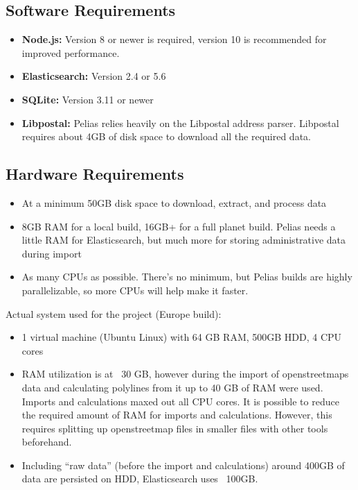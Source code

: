 \subsection{Software Requirements}
\begin{itemize}
\item \textbf{Node.js:} Version 8 or newer is required, version 10 is recommended for improved performance.
\item \textbf{Elasticsearch:} Version 2.4 or 5.6
\item \textbf{SQLite:} Version 3.11 or newer
\item \textbf{Libpostal:} Pelias relies heavily on the Libpostal address parser. Libpostal requires about 4GB of disk space to download all the required data.
\end{itemize}

\subsection{Hardware Requirements}
\begin{itemize}
\item At a minimum 50GB disk space to download, extract, and process data
\item 8GB RAM for a local build, 16GB+ for a full planet build. Pelias needs a little RAM for Elasticsearch, but much more for storing administrative data during import
\item As many CPUs as possible. There's no minimum, but Pelias builds are highly parallelizable, so more CPUs will help make it faster.
\end{itemize}

Actual system used for the project (Europe build):
\begin{itemize}
\item 1 virtual machine (Ubuntu Linux) with 64 GB RAM, 500GB HDD, 4 CPU cores
\item RAM utilization is at ~30 GB, however during the import of openstreetmaps data and calculating polylines from it up to 40 GB of RAM were used. Imports and calculations maxed out all CPU cores. It is possible to reduce the required amount of RAM for imports and calculations. However, this requires splitting up openstreetmap files in smaller files with other tools beforehand.
\item Including “raw data” (before the import and calculations) around 400GB of data are persisted on HDD, Elasticsearch uses ~100GB.
\end{itemize}